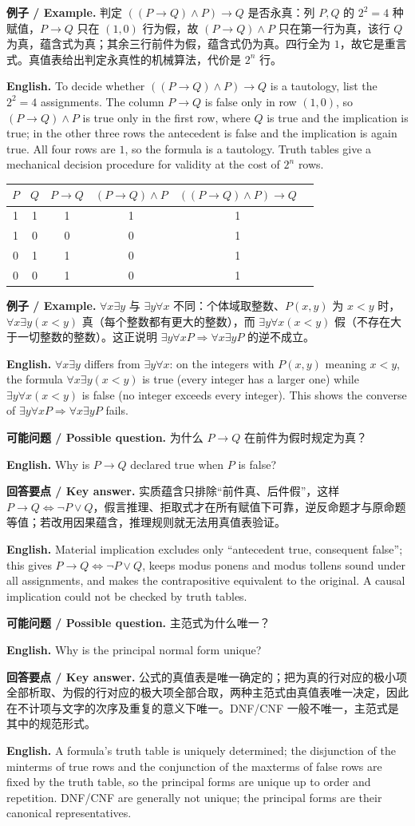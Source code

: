 \documentclass[UTF8,11pt,a4paper]{ctexart}
\newcommand{\EN}[1]{\par\noindent \textbf{English.} #1\par}
\newcommand{\EX}[2]{\par\noindent \textbf{例子 / Example.} #1\par\EN{#2}}
\newcommand{\ASK}[4]{\par\noindent \textbf{可能问题 / Possible question.} #1\par\EN{#2}\noindent \textbf{回答要点 / Key answer.} #3\par\EN{#4}\medskip}
\begin{document}
\EX{判定 $((P\to Q)\wedge P)\to Q$ 是否永真：列 $P,Q$ 的 $2^2=4$ 种赋值，$P\to Q$ 只在 $(1,0)$ 行为假，故 $(P\to Q)\wedge P$ 只在第一行为真，该行 $Q$ 为真，蕴含式为真；其余三行前件为假，蕴含式仍为真。四行全为 $1$，故它是重言式。真值表给出判定永真性的机械算法，代价是 $2^n$ 行。}{To decide whether $((P\to Q)\wedge P)\to Q$ is a tautology, list the $2^2=4$ assignments. The column $P\to Q$ is false only in row $(1,0)$, so $(P\to Q)\wedge P$ is true only in the first row, where $Q$ is true and the implication is true; in the other three rows the antecedent is false and the implication is again true. All four rows are $1$, so the formula is a tautology. Truth tables give a mechanical decision procedure for validity at the cost of $2^n$ rows.}
\begin{center}\small
\begin{tabular}{@{}cccccc@{}}
\toprule
$P$ & $Q$ & $P\to Q$ & $(P\to Q)\wedge P$ & $((P\to Q)\wedge P)\to Q$ \\
\midrule
1 & 1 & 1 & 1 & 1 \\
1 & 0 & 0 & 0 & 1 \\
0 & 1 & 1 & 0 & 1 \\
0 & 0 & 1 & 0 & 1 \\
\bottomrule
\end{tabular}
\end{center}
\EX{$\forall x\exists y$ 与 $\exists y\forall x$ 不同：个体域取整数、$P(x,y)$ 为 $x<y$ 时，$\forall x\exists y(x<y)$ 真（每个整数都有更大的整数），而 $\exists y\forall x(x<y)$ 假（不存在大于一切整数的整数）。这正说明 $\exists y\forall xP\Rightarrow\forall x\exists yP$ 的逆不成立。}{$\forall x\exists y$ differs from $\exists y\forall x$: on the integers with $P(x,y)$ meaning $x<y$, the formula $\forall x\exists y(x<y)$ is true (every integer has a larger one) while $\exists y\forall x(x<y)$ is false (no integer exceeds every integer). This shows the converse of $\exists y\forall xP\Rightarrow\forall x\exists yP$ fails.}

\ASK{为什么 $P\to Q$ 在前件为假时规定为真？}{Why is $P\to Q$ declared true when $P$ is false?}{实质蕴含只排除“前件真、后件假”，这样 $P\to Q\Leftrightarrow\neg P\vee Q$，假言推理、拒取式才在所有赋值下可靠，逆反命题才与原命题等值；若改用因果蕴含，推理规则就无法用真值表验证。}{Material implication excludes only ``antecedent true, consequent false''; this gives $P\to Q\Leftrightarrow\neg P\vee Q$, keeps modus ponens and modus tollens sound under all assignments, and makes the contrapositive equivalent to the original. A causal implication could not be checked by truth tables.}
\ASK{主范式为什么唯一？}{Why is the principal normal form unique?}{公式的真值表是唯一确定的；把为真的行对应的极小项全部析取、为假的行对应的极大项全部合取，两种主范式由真值表唯一决定，因此在不计项与文字的次序及重复的意义下唯一。DNF/CNF 一般不唯一，主范式是其中的规范形式。}{A formula's truth table is uniquely determined; the disjunction of the minterms of true rows and the conjunction of the maxterms of false rows are fixed by the truth table, so the principal forms are unique up to order and repetition. DNF/CNF are generally not unique; the principal forms are their canonical representatives.}
\end{document}
